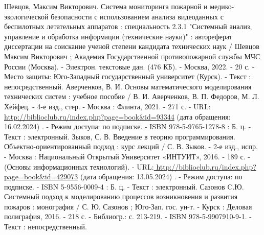 \begin{thebibliography}{50}
    \bibitem{} Шевцов, Максим Викторович.
    Система мониторинга пожарной и медико-экологической безопасности с использованием анализа видеоданных с беспилотных летательных аппаратов : специальность 2.3.1 "Системный анализ, управление и обработка информации (технические науки)" : автореферат диссертации на соискание ученой степени кандидата технических наук / Шевцов Максим Викторович ; Академия Государственной противопожарной службы МЧС России (Москва). - Электрон. текстовые дан. (476 КБ). - Москва, 2022. - 20 с. - Место защиты: Юго-Западный государственный университет (Курск). - Текст : непосредственный.
    \bibitem{} Аверченков, В. И.    Основы математического моделирования технических систем : учебное пособие / В. И. Аверченков, В. П. Федоров, М. Л. Хейфец. - 4-е изд., стер. - Москва : Флинта, 2021. - 271 с. - URL: \url{http://biblioclub.ru/index.php?page=book&id=93344} (дата обращения: 16.02.2024) . - Режим доступа: по подписке. - ISBN 978-5-9765-1278-8 : Б. ц. - Текст : электронный.
    \bibitem{} Зыков, С. В.    Введение в теорию программирования. Объектно-ориентированный подход : курс лекций / С. В. Зыков. - 2-е изд., испр. - Москва : Национальный Открытый Университет «ИНТУИТ», 2016. - 189 с. - (Основы информационных технологий). - URL:\url{ http://biblioclub.ru/index.php?page=book&id=429073} (дата обращения: 13.05.2024) . - Режим доступа: по подписке. - ISBN 5-9556-0009-4 : Б. ц. - Текст : электронный.
    \bibitem{} Сазонов C.Ю.    Системный подход к моделированию процессов возникновения и развития пожаров : монография / С. Ю. Сазонов ; Юго-Зап. гос. ун-т. - Курск : Деловая полиграфия, 2016. - 218 с. - Библиогр.: с. 213-219. - ISBN 978-5-9907910-9-1. - Текст : непосредственный.
\end{thebibliography}
